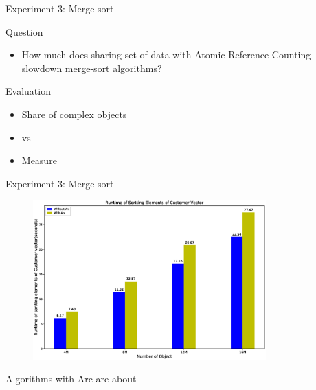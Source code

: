 \documentclass[9pt]{beamer}
\begin{document}

\begin{frame}[fragile]{Experiment 3: Merge-sort}

    Question
    \begin{itemize}
        \item How much does sharing set of data with Atomic Reference Counting slowdown merge-sort algorithms?
    \end{itemize}

    Evaluation
    \begin{itemize}
        \item Share  of complex objects
        \item {} vs 
        \item Measure 
    \end{itemize}

\end{frame}



\begin{frame}[fragile]{Experiment 3: Merge-sort}

    \begin{figure}[hp]
        \centering
        \begin{center}
                \includegraphics[width=0.8\textwidth]{images/rust_merge_sort.eps}
                \captionsetup{labelformat=empty}
        \end{center}
    \end{figure}
    \vspace{-.1 cm}
    Algorithms with Arc are about 
\end{frame}
\end{document}
